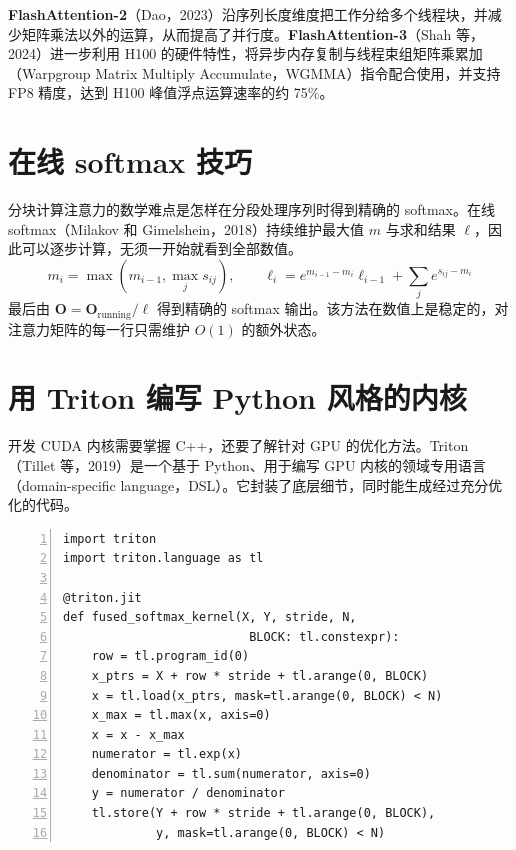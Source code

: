 
\textbf{FlashAttention-2}（Dao，2023）沿序列长度维度把工作分给多个线程块，并减少矩阵乘法以外的运算，从而提高了并行度。\textbf{FlashAttention-3}（Shah 等，2024）进一步利用 H100 的硬件特性，将异步内存复制与线程束组矩阵乘累加（Warpgroup Matrix Multiply Accumulate，WGMMA）指令配合使用，并支持 FP8 精度，达到 H100 峰值浮点运算速率的约 75\%。

\section{在线 softmax 技巧}

分块计算注意力的数学难点是怎样在分段处理序列时得到精确的 softmax。在线 softmax（Milakov 和 Gimelshein，2018）持续维护最大值 \(m\) 与求和结果 \(\ell\)，因此可以逐步计算，无须一开始就看到全部数值。
\[
  m_i=\max\!\left(m_{i-1},\max_j s_{ij}\right),\qquad
  \ell_i=e^{m_{i-1}-m_i}\ell_{i-1}+\sum_j e^{s_{ij}-m_i}
\]
最后由 \(\mathbf{O}=\mathbf{O}_{\mathrm{running}}/\ell\) 得到精确的 softmax 输出。该方法在数值上是稳定的，对注意力矩阵的每一行只需维护 \(O(1)\) 的额外状态。

\section{用 Triton 编写 Python 风格的内核}

开发 CUDA 内核需要掌握 C++，还要了解针对 GPU 的优化方法。Triton（Tillet 等，2019）是一个基于 Python、用于编写 GPU 内核的领域专用语言（domain-specific language，DSL）。它封装了底层细节，同时能生成经过充分优化的代码。

\begin{lstlisting}[numbers=left,numberstyle=\tiny\color{boxgray},numbersep=10pt]
import triton
import triton.language as tl

@triton.jit
def fused_softmax_kernel(X, Y, stride, N,
                          BLOCK: tl.constexpr):
    row = tl.program_id(0)
    x_ptrs = X + row * stride + tl.arange(0, BLOCK)
    x = tl.load(x_ptrs, mask=tl.arange(0, BLOCK) < N)
    x_max = tl.max(x, axis=0)
    x = x - x_max
    numerator = tl.exp(x)
    denominator = tl.sum(numerator, axis=0)
    y = numerator / denominator
    tl.store(Y + row * stride + tl.arange(0, BLOCK),
             y, mask=tl.arange(0, BLOCK) < N)
\end{lstlisting}

